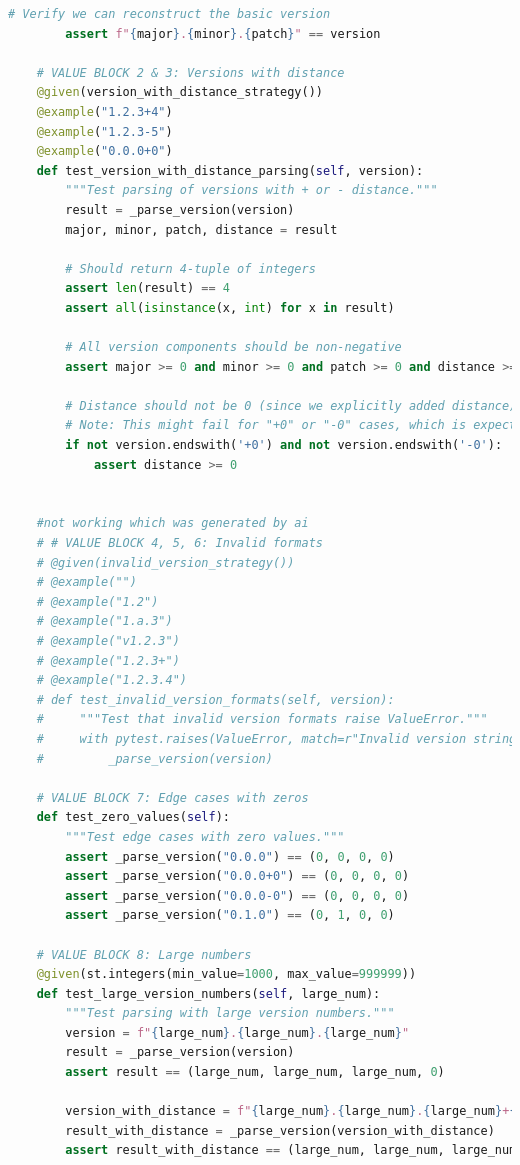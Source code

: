 \documentclass[a4paper]{scrreprt}
\begin{document}
\begin{aiTask}
\begin{answer}
\begin{lstlisting}[language=Python]
        # Verify we can reconstruct the basic version
        assert f"{major}.{minor}.{patch}" == version
    
    # VALUE BLOCK 2 & 3: Versions with distance
    @given(version_with_distance_strategy())
    @example("1.2.3+4")
    @example("1.2.3-5")
    @example("0.0.0+0")
    def test_version_with_distance_parsing(self, version):
        """Test parsing of versions with + or - distance."""
        result = _parse_version(version)
        major, minor, patch, distance = result
        
        # Should return 4-tuple of integers
        assert len(result) == 4
        assert all(isinstance(x, int) for x in result)
        
        # All version components should be non-negative
        assert major >= 0 and minor >= 0 and patch >= 0 and distance >= 0
        
        # Distance should not be 0 (since we explicitly added distance)
        # Note: This might fail for "+0" or "-0" cases, which is expected behavior
        if not version.endswith('+0') and not version.endswith('-0'):
            assert distance >= 0
    

    #not working which was generated by ai
    # # VALUE BLOCK 4, 5, 6: Invalid formats
    # @given(invalid_version_strategy())
    # @example("")
    # @example("1.2")
    # @example("1.a.3")
    # @example("v1.2.3")
    # @example("1.2.3+")
    # @example("1.2.3.4")
    # def test_invalid_version_formats(self, version):
    #     """Test that invalid version formats raise ValueError."""
    #     with pytest.raises(ValueError, match=r"Invalid version string"):
    #         _parse_version(version)
    
    # VALUE BLOCK 7: Edge cases with zeros
    def test_zero_values(self):
        """Test edge cases with zero values."""
        assert _parse_version("0.0.0") == (0, 0, 0, 0)
        assert _parse_version("0.0.0+0") == (0, 0, 0, 0)
        assert _parse_version("0.0.0-0") == (0, 0, 0, 0)
        assert _parse_version("0.1.0") == (0, 1, 0, 0)
    
    # VALUE BLOCK 8: Large numbers
    @given(st.integers(min_value=1000, max_value=999999))
    def test_large_version_numbers(self, large_num):
        """Test parsing with large version numbers."""
        version = f"{large_num}.{large_num}.{large_num}"
        result = _parse_version(version)
        assert result == (large_num, large_num, large_num, 0)
        
        version_with_distance = f"{large_num}.{large_num}.{large_num}+{large_num}"
        result_with_distance = _parse_version(version_with_distance)
        assert result_with_distance == (large_num, large_num, large_num, large_num)
    

\end{lstlisting}
\end{answer}
\end{aiTask}
\end{document}
